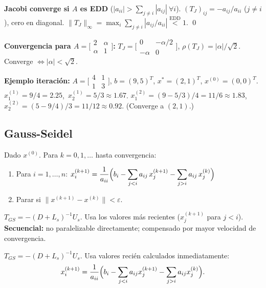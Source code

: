 \documentclass[12pt,a4paper]{article}
\begin{document}
\begin{resultado}
\textbf{Jacobi converge si $A$ es EDD} ($|a_{ii}|>\sum_{j\ne i}|a_{ij}|\ \forall i$).
$(T_J)_{ij}=-a_{ij}/a_{ii}$ ($j\ne i$), cero en diagonal.
$\|T_J\|_\infty=\max_i\sum_{j\ne i}|a_{ij}/a_{ii}|\overset{\text{EDD}}{<}1$. \qed
\end{resultado}

\textbf{Convergencia para $A=\bigl[\begin{smallmatrix}2&\alpha\\\alpha&1\end{smallmatrix}\bigr]$:}
$T_J=\bigl[\begin{smallmatrix}0&-\alpha/2\\-\alpha&0\end{smallmatrix}\bigr]$,
$\rho(T_J)=|\alpha|/\sqrt{2}$.
Converge $\Leftrightarrow |\alpha|<\sqrt{2}$.

\textbf{Ejemplo iteración:} $A=\bigl[\begin{smallmatrix}4&1\\1&3\end{smallmatrix}\bigr]$, $b=(9,5)^T$, $x^*=(2,1)^T$, $x^{(0)}=(0,0)^T$.
$x_1^{(1)}=9/4=2.25$,\ $x_2^{(1)}=5/3\approx1.67$.
$x_1^{(2)}=(9-5/3)/4=11/6\approx1.83$,\ $x_2^{(2)}=(5-9/4)/3=11/12\approx0.92$. (Converge a $(2,1)$.)

\subsection{Gauss-Seidel}

\begin{algoritmo}[title={Método de Gauss-Seidel}]
Dado $x^{(0)}$. Para $k=0,1,\ldots$ hasta convergencia:
\begin{enumerate}[noitemsep]
  \item Para $i=1,\ldots,n$: $x_i^{(k+1)}=\dfrac{1}{a_{ii}}\Bigl(b_i-\displaystyle\sum_{j<i}a_{ij}\,x_j^{(k+1)}-\sum_{j>i}a_{ij}\,x_j^{(k)}\Bigr)$
  \item Parar si $\|x^{(k+1)}-x^{(k)}\|<\varepsilon$.
\end{enumerate}
$T_{GS}=-(D+L_s)^{-1}U_s$. Usa los valores más recientes ($x_j^{(k+1)}$ para $j<i$).\\
\textbf{Secuencial:} no paralelizable directamente; compensado por mayor velocidad de convergencia.
\end{algoritmo}

$T_{GS}=-(D+L_s)^{-1}U_s$. Usa valores recién calculados inmediatamente:
\[
  x_i^{(k+1)}=\frac{1}{a_{ii}}\Bigl(b_i-\sum_{j<i}a_{ij}x_j^{(k+1)}-\sum_{j>i}a_{ij}x_j^{(k)}\Bigr).
\]
\end{document}
